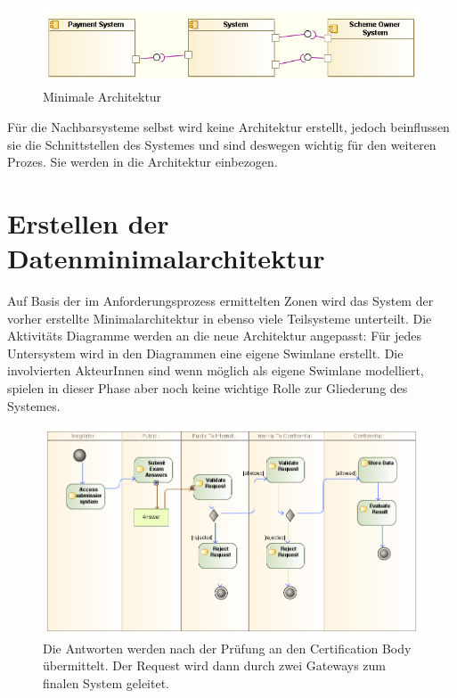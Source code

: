 \begin{figure}[H]
    \centering
    \includegraphics[scale=0.7]{uml/minimalarch.png}
    \caption{Minimale Architektur}
\end{figure}

Für die Nachbarsysteme selbst wird keine Architektur erstellt, jedoch beinflussen sie die Schnittstellen des Systemes und sind deswegen wichtig für den weiteren Prozes. Sie werden in die Architektur einbezogen.

\section{Erstellen der Datenminimalarchitektur}
Auf Basis der im Anforderungsprozess ermittelten Zonen wird das System der vorher erstellte Minimalarchitektur in ebenso viele Teilsysteme unterteilt. Die Aktivitäts Diagramme werden an die neue Architektur angepasst: Für jedes Untersystem wird in den Diagrammen eine eigene Swimlane erstellt. Die involvierten AkteurInnen sind wenn möglich als eigene Swimlane modelliert, spielen in dieser Phase aber noch keine wichtige Rolle zur Gliederung des Systemes.

\begin{figure}[H]
    \centering
    \includegraphics[scale=0.5]{uml/takeexamactivity1.png}
    \caption{Die Antworten werden nach der Prüfung an den Certification Body übermittelt. Der Request wird dann durch zwei Gateways zum finalen System geleitet.}
\end{figure}

